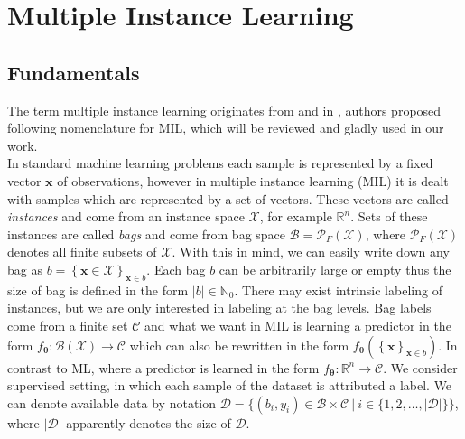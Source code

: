 \chapter{Multiple Instance Learning}
\section{Fundamentals}
The term multiple instance learning originates from \cite{MILfirstly} and in \cite{mandlik}, authors proposed following nomenclature for MIL, which will be reviewed and gladly used in our work. \\
In standard machine learning problems each sample is represented by a fixed vector $\boldsymbol{x}$ of observations, however in multiple instance learning (MIL) it is dealt with samples which are represented by a set of vectors. These vectors are called \emph{instances} and come from an instance space $\mathcal{X}$, for example $\mathbb{R}^n$. Sets of these instances are called \emph{bags} and come from bag space $\mathcal{B} = \mathcal{P}_F\left(\mathcal{X}\right)$, where $\mathcal{P}_F\left(\mathcal{X}\right)$ denotes all finite subsets of $\mathcal{X}$. With this in mind, we can easily write down any bag as $b = \left\lbrace \boldsymbol{x} \in  \mathcal{X} \right\rbrace_{\boldsymbol{x} \in b}$. Each bag $b$ can be arbitrarily large or empty thus the size of bag is defined in the form $\vert b\vert \in \mathbb{N}_0$. There may exist intrinsic labeling of instances, but we are only interested in labeling at the bag levels. Bag labels come from a finite set $\mathcal{C}$ and what we want in MIL is learning a predictor in the form $f_{\boldsymbol{\theta}}: \mathcal{B}\left(\mathcal{X}\right) \rightarrow \mathcal{C}$ which can also be rewritten in the form $f_{\boldsymbol{\theta}}\left(\left\lbrace \boldsymbol{x}\right\rbrace_{\boldsymbol{x}\in b}\right)$. In contrast to ML, where a predictor is learned in the form  $f_{\boldsymbol{\theta}}: \mathbb{R}^n \rightarrow \mathcal{C}$.  We consider supervised setting, in which each sample of the dataset is attributed a label. We can denote available data by notation $\mathcal{D} = \Big\lbrace \left(b_i, y_i\right) \in \mathcal{B}\times\mathcal{C} \ | \ i \in \big\lbrace 1,2,\dots,\vert \mathcal{D} \vert \big\rbrace \Big\rbrace$, where $\vert \mathcal{D} \vert$ apparently denotes the size of $\mathcal{D}$. 
